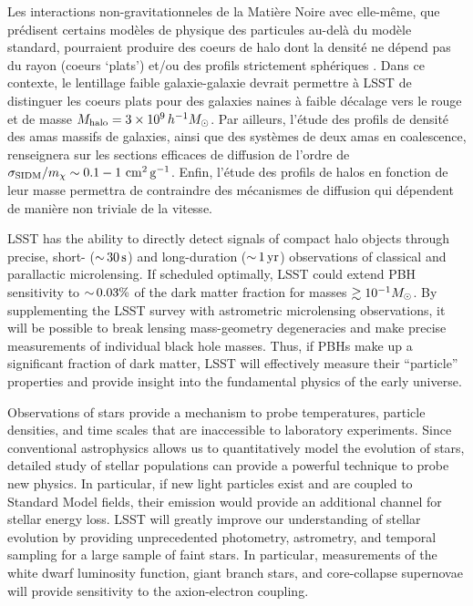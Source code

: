 \documentclass[12pt]{article}
\begin{document}
Les interactions non-gravitationneles de la Matière Noire avec elle-même, que prédisent certains modèles de physique des particules au-delà du modèle standard, pourraient produire des coeurs de halo dont la densité ne dépend pas du rayon (coeurs `plats')\citep[coeurs `plats', ][]{Spergel:1999mh} et/ou des profils strictement sphériques \citep{Peter:2013}.
Dans ce contexte, le lentillage faible galaxie-galaxie devrait permettre à LSST de distinguer les coeurs plats pour des galaxies naines à faible décalage vers le rouge et de masse $M_\text{halo} = 3\times10^9\,h^{-1}M_\odot$. Par ailleurs, l'étude des profils de densité des amas massifs de galaxies, ainsi que des systèmes de deux amas en coalescence, renseignera sur les sections efficaces de diffusion de l'ordre de $\sigma_{\rm SIDM}/m_\chi \sim 0.1-1 \mathrm{\,\mathrm{\,cm}^2\mathrm{\,g}^{-1}}$. Enfin, l'étude des profils de halos en fonction de leur masse permettra de contraindre des mécanismes de diffusion qui dépendent de manière non triviale de la vitesse. 

LSST has the ability to directly detect signals of compact halo objects through precise, short- ($ {\sim}\, 30 \mathrm{\,s}$) and long-duration ($ {\sim}\,1 \mathrm{\,yr}$) observations of classical and parallactic microlensing\citep{1509.04899}.
If scheduled optimally, LSST could extend PBH sensitivity to $ {\sim}\,0.03\%$ of the dark matter fraction for masses $\gtrsim 10^{-1} M_\odot$.
By supplementing the LSST survey with astrometric microlensing observations, it will be possible to break lensing mass-geometry degeneracies and make precise measurements of individual black hole masses. Thus, if PBHs make up a significant fraction of dark matter, LSST will effectively measure their ``particle'' properties and provide insight into the fundamental physics of the early universe.


Observations of stars provide a mechanism to probe temperatures, particle densities, and time scales that are inaccessible to laboratory experiments. Since conventional astrophysics allows us to quantitatively model the evolution of stars, detailed study of stellar populations can provide a powerful technique to probe new physics. In particular, if new light particles exist and are coupled to Standard Model fields, their emission would provide an additional channel for stellar energy loss. 
LSST will greatly improve our understanding of stellar evolution by providing unprecedented photometry, astrometry, and temporal sampling for a large sample of faint stars. In particular, measurements of the white dwarf luminosity function, giant branch stars, and core-collapse supernovae will provide sensitivity to the axion-electron coupling.
\end{document}
